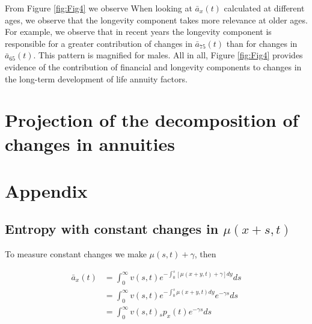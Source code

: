 \documentclass[12pt]{article}
\begin{document}
From Figure \ref{fig:Fig4} we observe When looking at $\bar{a}_x(t)$ calculated at different ages, we observe that the longevity component takes more relevance at older ages. For example, we observe that in recent years the longevity component is responsible for a greater contribution of changes in $\bar{a}_{75}(t)$ than for changes in $\bar{a}_{65}(t)$. This pattern is magnified for males. All in all, Figure \ref{fig:Fig4} provides evidence of the contribution of financial and longevity components to changes in the long-term development of life annuity factors.









\FloatBarrier
\section{Projection of the decomposition of changes in annuities}









\newpage


%
%



\newpage

\appendix
\section{Appendix}



\subsection{Entropy with constant changes in $\mu(x+s,t)$}\label{sec:EntropyConst}

To measure constant changes we make $\mu(s,t)+\gamma$, then

\begin{equation}\label{eq:EntropyConst1}
\begin{split}
\bar{a}_{x}(t) &= \int_0^\infty{v}(s,t) e^{-\int_{0}^{s} [\mu(x+y,t)+\gamma]dy}ds \\
&= \int_0^\infty {v}(s,t)e^{-\int_{0}^{s} \mu(x+y,t)dy} e^{-\gamma s}ds \\
&= \int_0^\infty {v}(s,t){}_sp_x(t) e^{-\gamma s}ds \\
\end{split}
\end{equation}
\end{document}
